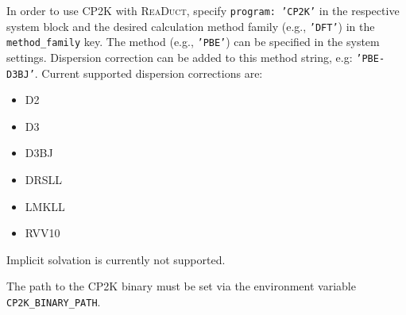 \documentclass[]{tufte-book}
\begin{document}
In order to use \textsc{CP2K} with \textsc{ReaDuct}, specify \texttt{program: 'CP2K'} in the respective system block and the desired
calculation method family (e.g., \texttt{'DFT'}) in the \texttt{method\_family} key.
The method (e.g., \texttt{'PBE'}) can be specified in the system settings. Dispersion correction can be added to this method string, e.g: \texttt{'PBE-D3BJ'}. Current supported dispersion corrections are:
\begin{itemize}
 	\item D2
 	\item D3
 	\item D3BJ
 	\item DRSLL
 	\item LMKLL
 	\item RVV10
\end{itemize}

Implicit solvation is currently not supported.

The path to the \textsc{CP2K} binary must be set via the environment variable \texttt{CP2K\_BINARY\_PATH}.
\end{document}

